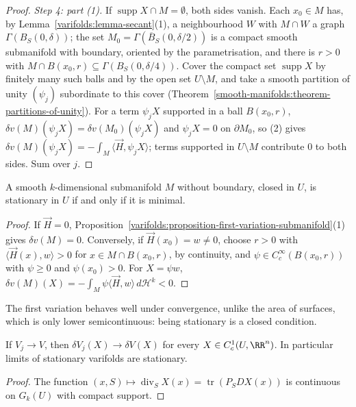 \begin{proof}
\emph{Step 4: part (1).} If $\operatorname{supp}X \cap M = \emptyset$, both sides vanish. Each $x_0 \in M$ has, by Lemma~\ref{varifolds:lemma-secant}(1), a neighbourhood $W$ with $M \cap W$ a graph
$\Gamma(B_S(0, \delta))$; the set $M_0 = \Gamma(\overline{B}_S(0, \delta/2))$ is a compact smooth submanifold with boundary, oriented by the parametrisation, and there is $r > 0$ with
$M \cap B(x_0, r) \subseteq \Gamma(B_S(0, \delta/4))$. Cover the compact set $\operatorname{supp}X$ by finitely many such balls and by the open set $U \setminus M$, and take a smooth partition of unity
$(\psi_j)$ subordinate to this cover (Theorem~\ref{smooth-manifolds:theorem-partitions-of-unity}). For a term $\psi_jX$ supported in a ball $B(x_0, r)$, $\delta v(M)(\psi_jX) = \delta v(M_0)(\psi_jX)$ and
$\psi_jX = 0$ on $\partial M_0$, so (2) gives $\delta v(M)(\psi_jX) = -\int_M\langle\vec{H}, \psi_jX\rangle$; terms supported in $U \setminus M$ contribute $0$ to both sides. Sum over $j$.
\end{proof}

\begin{corollary}\label{varifolds:corollary-stationary-minimal}
A smooth $k$-dimensional submanifold $M$ without boundary, closed in $U$, is stationary in $U$ if and only if it is minimal.
\end{corollary}

\begin{proof}
If $\vec{H} = 0$, Proposition~\ref{varifolds:proposition-first-variation-submanifold}(1) gives $\delta v(M) = 0$. Conversely, if $\vec{H}(x_0) = w \neq 0$, choose $r > 0$ with $\langle\vec{H}(x), w\rangle > 0$ for
$x \in M \cap B(x_0, r)$, by continuity, and $\psi \in C^\infty_c(B(x_0, r))$ with $\psi \geq 0$ and $\psi(x_0) > 0$. For $X = \psi w$, $\delta v(M)(X) = -\int_M\psi\langle\vec{H}, w\rangle\,d\mathcal{H}^k < 0$.
\end{proof}

The first variation behaves well under convergence, unlike the area of surfaces, which is only lower semicontinuous: being stationary is a closed condition.

\begin{proposition}\label{varifolds:proposition-first-variation-continuous}
If $V_j \to V$, then $\delta V_j(X) \to \delta V(X)$ for every $X \in C^1_c(U, \RR^n)$. In particular limits of stationary varifolds are stationary.
\end{proposition}

\begin{proof}
The function $(x, S) \mapsto \operatorname{div}_SX(x) = \operatorname{tr}(P_SDX(x))$ is continuous on $G_k(U)$ with compact support.
\end{proof}

